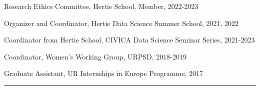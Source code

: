 \documentclass[margin,line,10.95pt]{res}
\begin{document}
\begin{resume}
Research Ethics Committee, Hertie School, Member, 2022-2023
\vspace*{-4.5mm}

Organizer and Coordinator, Hertie Data Science Summer School, 2021, 2022
\vspace*{-4.5mm}

Coordinator from Hertie School, CIVICA Data Science Seminar Series, 2021-2023
\vspace*{-3.5mm}

Coordinator, Women's Working Group,  URPSD,  2018-2019
\vspace*{-4.5mm}

Graduate Assistant, UR Internships in Europe Programme,  2017

\begin{center}
	\noindent\rule{8cm}{0.4pt}
\end{center}
\vspace{0.5em}


\end{resume}
\end{document}
